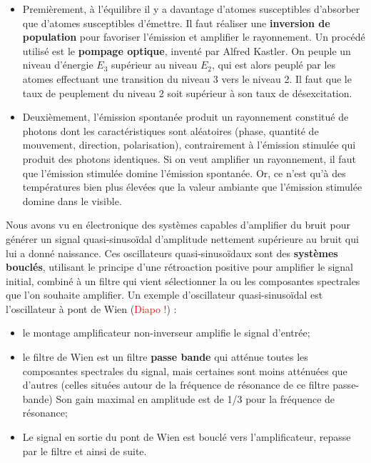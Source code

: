 \documentclass[11pt,a4paper]{report}
\begin{document}
\begin{itemize}
	\item Premièrement, à l'équilibre il y a davantage d'atomes susceptibles d'absorber que d'atomes 			susceptibles d'émettre. Il faut réaliser une \textbf{inversion de population} pour favoriser 			l'émission et amplifier le rayonnement. Un procédé utilisé est le \textbf{pompage optique}, 			inventé par Alfred Kastler. On peuple un niveau d'énergie $E_3$ supérieur au niveau $E_2$, qui 			est alors peuplé par les atomes effectuant une transition du niveau 3 vers le niveau 2. Il faut 		que le taux de peuplement du niveau 2 soit supérieur à son taux de désexcitation.\\
		
	\item Deuxièmement, l'émission spontanée produit un rayonnement constitué de photons dont les 				caractéristiques sont aléatoires (phase, quantité de mouvement, direction, polarisation), 				contrairement à l'émission stimulée qui produit des photons identiques. Si on veut amplifier un 		rayonnement, il faut que l'émission stimulée domine l'émission spontanée. Or, ce n'est qu'à des 		températures bien plus élevées que la valeur ambiante que l'émission stimulée domine dans le 			visible.\\ 
\end{itemize}

Nous avons vu en électronique des systèmes capables d'amplifier du bruit pour générer un signal quasi-sinusoïdal d'amplitude nettement supérieure au bruit qui lui a donné naissance. Ces oscillateurs quasi-sinusoïdaux sont des \textbf{systèmes bouclés}, utilisant le principe d'une rétroaction positive pour amplifier le signal initial, combiné à un filtre qui vient sélectionner la ou les composantes spectrales que l'on souhaite amplifier. Un exemple d'oscillateur quasi-sinusoïdal est l'oscillateur à pont de Wien (\textcolor{red}{Diapo !}) :\\
\begin{itemize}
	\item le montage amplificateur non-inverseur amplifie le signal d'entrée;
	\item le filtre de Wien est un filtre \textbf{passe bande} qui atténue toutes les composantes 				spectrales du signal, mais certaines sont moins atténuées que d'autres (celles situées autour 			de la fréquence de résonance de ce filtre passe-bande) Son gain maximal en amplitude est de 1/3 		pour la fréquence de résonance; 
	\item Le signal en sortie du pont de Wien est bouclé vers l'amplificateur, repasse par le 				filtre et ainsi de suite.\\
\end{itemize}
\end{document}
